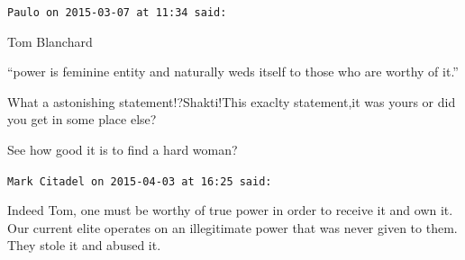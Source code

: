 \begin{footnotesize}
\begin{sffamily}
\hfill

\texttt{Paulo on 2015-03-07 at 11:34 said:}

Tom Blanchard

``power is feminine entity and naturally weds itself to those who are worthy of it.''

What a astonishing statement!?Shakti!This exaclty statement,it was yours or did you get in some place else?

See how good it is to find a hard woman?

\hfill

\texttt{Mark Citadel on 2015-04-03 at 16:25 said:}

Indeed Tom, one must be worthy of true power in order to receive it and own it. Our current elite operates on an illegitimate power that was never given to them. They stole it and abused it.

\end{sffamily}
\end{footnotesize}

